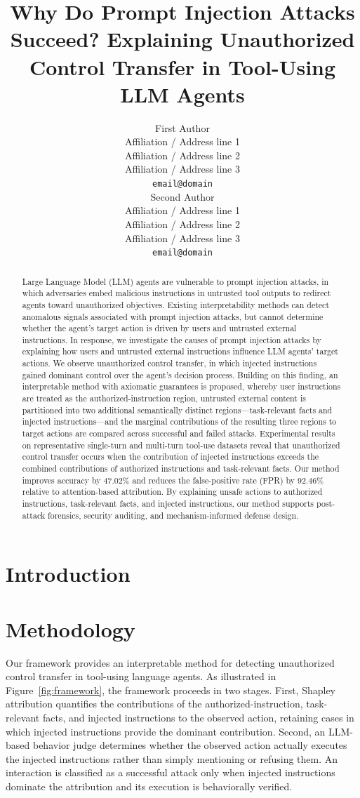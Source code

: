 \documentclass[11pt]{article}
\title{Why Do Prompt Injection Attacks Succeed? Explaining Unauthorized Control Transfer in Tool-Using LLM Agents}
\author{First Author \\
  Affiliation / Address line 1 \\
  Affiliation / Address line 2 \\
  Affiliation / Address line 3 \\
  \texttt{email@domain} \\\And
  Second Author \\
  Affiliation / Address line 1 \\
  Affiliation / Address line 2 \\
  Affiliation / Address line 3 \\
  \texttt{email@domain} \\}
\begin{document}
\maketitle

\begin{abstract}
Large Language Model (LLM) agents are vulnerable to prompt injection attacks, in which adversaries embed malicious instructions in untrusted tool outputs to redirect agents toward unauthorized objectives. Existing interpretability methods can detect anomalous signals associated with prompt injection attacks, but cannot determine whether the agent’s target action is driven by users and untrusted external instructions. In response, we investigate the causes of prompt injection attacks by explaining how users and untrusted external instructions influence LLM agents’ target actions. We observe unauthorized control transfer, in which injected instructions gained dominant control over the agent’s decision process. Building on this finding, an interpretable method with axiomatic guarantees is proposed, whereby user instructions are treated as the authorized-instruction region, untrusted external content is partitioned into two additional semantically distinct regions—task-relevant facts and injected instructions—and the marginal contributions of the resulting three regions to target actions are compared across successful and failed attacks. Experimental results on representative single-turn and multi-turn tool-use datasets reveal that unauthorized control transfer occurs when the contribution of injected instructions exceeds the combined contributions of authorized instructions and task-relevant facts. Our method improves accuracy by 47.02\% and reduces the false-positive rate (FPR) by 92.46\% relative to attention-based attribution. By explaining unsafe actions to authorized instructions, task-relevant facts, and injected instructions, our method supports post-attack forensics, security auditing, and mechanism-informed defense design.
\end{abstract}

\section{Introduction}

\section{Methodology}

Our framework provides an interpretable method for detecting unauthorized control transfer in tool-using language agents. As illustrated in Figure~\ref{fig:framework}, the framework proceeds in two stages. First, Shapley attribution quantifies the contributions of the authorized-instruction, task-relevant facts, and injected instructions to the observed action, retaining cases in which injected instructions provide the dominant contribution. Second, an LLM-based behavior judge determines whether the observed action actually executes the injected instructions rather than simply mentioning or refusing them. An interaction is classified as a successful attack only when injected instructions dominate the attribution and its execution is behaviorally verified.
\end{document}
